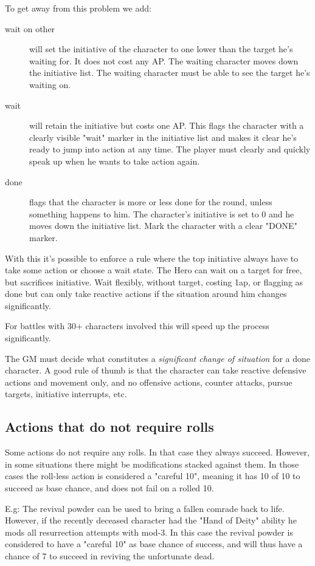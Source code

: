To get away from this problem we add:
\begin{description}
\item[wait on other] will set the initiative of the character to one lower than the target he's waiting for. It does not cost any AP. The waiting character moves down the initiative list. The waiting character must be able to see the target he's waiting on.
\item[wait] will retain the initiative but costs one AP. This flags the character with a clearly visible "wait" marker in the initiative list and makes it clear he's ready to jump into action at any time. The player must clearly and quickly speak up when he wants to take action again.
\item[done] flags that the character is more or less done for the round, unless something happens to him. The character's initiative is set to 0 and he moves down the initiative list. Mark the character with a clear "DONE" marker.
\end{description}

With this it's possible to enforce a rule where the top initiative always have to take some action or choose a wait state. The Hero can wait on a target for free, but sacrifices initiative. Wait flexibly, without target, costing 1ap, or flagging as done but can only take reactive actions if the situation around him changes significantly.

For battles with 30+ characters involved this will speed up the process significantly.

The GM must decide what constitutes a \emph{significant change of situation} for a done character. A good rule of thumb is that the character can take reactive defensive actions and movement only, and no offensive actions, counter attacks, pursue targets, initiative interrupts, etc.


\subsection*{Actions that do not require rolls}
Some actions do not require any rolls. In that case they always succeed. However, in some situations there might be modifications stacked against them. In those cases the roll-less action is considered a "careful 10", meaning it has 10 of 10 to succeed as base chance, and does not fail on a rolled 10.

E.g: The revival powder can be used to bring a fallen comrade back to life. However, if the recently deceased character had the "Hand of Deity" ability he mods all resurrection attempts with mod-3. In this case the revival powder is considered to have a "careful 10" as base chance of success, and will thus have a chance of 7 to succeed in reviving the unfortunate dead.


